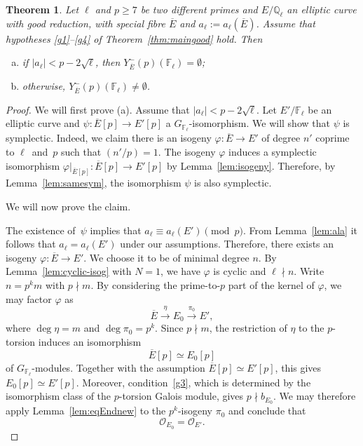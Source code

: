 \documentclass[12pt]{amsart}
\numberwithin{equation}{section}
\newtheorem{theorem}[equation]{Theorem}
\theoremstyle{definition}
\newcommand{\F}{\mathbb{F}}
\newcommand{\Q}{\mathbb{Q}}
\newcommand{\oE}{\overline{E}}
\newcommand{\cO}{\mathcal{O}}
\begin{document}
\begin{theorem}\label{prop:good2}
    Let $\ell$ and $p \geq 7$ be two different primes and $E/\Q_\ell$ an elliptic curve with good reduction, with special fibre $\oE$ and $a_\ell:=a_\ell(\oE)$.
    Assume that hypotheses \eqref{g1}--\eqref{g4} of Theorem~\ref{thm:maingood} hold. Then
    \begin{enumerate}[(a)]
        \item if $|a_\ell |< p-2\sqrt{\ell}$, then $Y^-_{\oE}(p)(\F_\ell)=\emptyset$;
        \item otherwise, $Y^-_{\oE}(p)(\F_\ell)\neq\emptyset$.
    \end{enumerate}
\end{theorem}
\begin{proof}

We will first prove (a). Assume that $|a_\ell |< p-2\sqrt{\ell}$. 
Let $E' / \F_\ell$ be an elliptic curve and $\psi : \oE[p] \to E'[p]$ a $G_{\F_\ell}$-isomorphism. We will show that 
$\psi$ is symplectic. Indeed,
we claim there is an isogeny $\varphi :\oE \to E'$ of degree $n'$ coprime to $\ell$~and~$p$ such that $(n' /p)=1$.
The isogeny $\varphi$ induces a symplectic isomorphism
$\varphi|_{\oE[p]} : \oE[p] \to E'[p]$ by Lemma~\ref{lem:isogeny}.
Therefore, by Lemma~\ref{lem:samesym}, the isomorphism
$\psi$ is also symplectic.

We will now prove the claim.

The existence of~$\psi$ implies that $a_\ell\equiv a_\ell(E') \pmod p$.
From Lemma~\ref{lem:ala} it follows that $a_\ell = a_\ell(E')$ under our assumptions. Therefore, there exists an isogeny $\varphi:\oE \to E'$. We choose it to be of minimal degree $n$. By Lemma~\ref{lem:cyclic-isog} with $N=1$, we have $\varphi$ is cyclic and $\ell \nmid n$.
Write $n=p^k m$ with $ p\nmid m.$
By considering the prime-to-$p$ part of the kernel of $\varphi$, we may
factor $\varphi$ as
\[
    \overline E\xrightarrow{\eta}E_0\xrightarrow{\pi_0}E',
\]
where $\deg\eta=m$ and $\deg \pi_0 =p^k$.
Since $p\nmid m$, the restriction of $\eta$ to the $p$-torsion induces an
isomorphism
\[
    \overline E[p]\simeq E_0[p]
\]
of $G_{\F_\ell}$-modules. Together with the assumption
$\overline E[p]\simeq E'[p]$, this gives $E_0[p]\simeq E'[p].$
Moreover, condition~\eqref{g3}, which is determined by the isomorphism class of
the $p$-torsion Galois module, gives $p\nmid b_{E_0}$. 
We may therefore
apply Lemma~\ref{lem:eqEndnew} to the $p^k$-isogeny $\pi_0$ and conclude that
\[
    \cO_{E_0}=\cO_{E'}.
\]


\end{proof}
\end{document}
